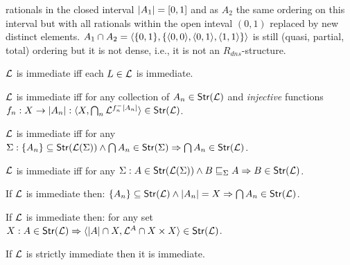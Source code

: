 \documentclass[12pt]{article}
\begin{document}
rationals in the closed interval $|A_1|=[0,1]$ and as $A_2$ the same
ordering on this interval
but with all rationals within the open inteval $(0,1)$ replaced by new distinct
elements. $A_1\cap A_2=\langle\{0,1\},\{\langle0,0\rangle,\langle0,1\rangle,\langle1,1\rangle\}\rangle$ is still (quasi, partial, total) ordering but it
is not dense, i.e., it is not an $R_{dns}$-structure.
%
\begin{Prop}\label{cl:iff}
\begin{enum}
\item\label{eachL} ${{\cal{L}}}$ is immediate iff each $L\in{{\cal{L}}}$ is immediate.\comt{}
\item\label{injective} ${{\cal{L}}}$ is immediate iff
for  any collection of $A_n\in{\sf {Str}}({{\cal{L}}})$
 and  {\em injective} functions $f_n:X\rightarrow |A_n| : \langle X, \bigcap_n
 {{\cal{L}}}^{f_{n}^{-}[A_{n}]}\rangle\in{\sf {Str}}({{\cal{L}}})$.
\item\label{ifSigma} ${{\cal{L}}}$ is immediate iff
for any $\Sigma: \{A_n\}\subseteq{\sf {Str}}({{\cal{L}}}(\Sigma)) \land
\bigcap A_n\in{\sf {Str}}(\Sigma) \Rightarrow \bigcap A_n\in{\sf {Str}}({{\cal{L}}})$.
\item\label{ifsub} ${{\cal{L}}}$ is immediate iff
for  any $\Sigma: A\in{\sf {Str}}({{\cal{L}}}(\Sigma)) \land 
B\sqsubseteq_\Sigma A \Rightarrow B\in {\sf {Str}}({{\cal{L}}})$.
\item\label{samecar} If ${{\cal{L}}}$ is immediate then:
$\{A_n\}\subseteq{\sf {Str}}({{\cal{L}}})\land|A_n|=X \Rightarrow \bigcap A_n\in{\sf {Str}}({{\cal{L}}})$.
\item\label{subset} If ${{\cal{L}}}$ is immediate then: 
for any  set $X: A\in {\sf {Str}}({{\cal{L}}}) \Rightarrow \langle|A|\cap X,
{{\cal{L}}}^A\cap X\times X\rangle\in {\sf {Str}}({{\cal{L}}})$.
\item\label{sii} If ${{\cal{L}}}$ is strictly immediate then it is immediate.
\end{enum}
\end{Prop}
\end{document}
